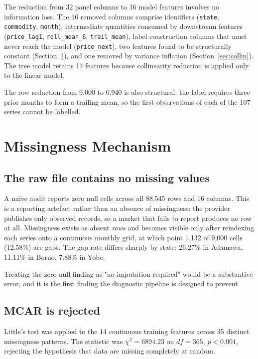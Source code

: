 \documentclass[conference]{IEEEtran}
\begin{document}
The reduction from 32 panel columns to 16 model features involves no
information loss. The 16 removed columns comprise identifiers
(\texttt{state}, \texttt{commodity}, \texttt{month}), intermediate quantities
consumed by downstream features (\texttt{price\_lag1}, \texttt{roll\_mean\_6},
\texttt{trail\_mean}), label construction columns that must never reach the
model (\texttt{price\_next}), two features found to be structurally constant
(Section~\ref{sec:missing}), and one removed by variance inflation
(Section~\ref{sec:collin}). The tree model retains 17 features because
collinearity reduction is applied only to the linear model.

The row reduction from 9{,}000 to 6{,}940 is also structural: the label
requires three prior months to form a trailing mean, so the first observations
of each of the 107 series cannot be labelled.

\section{Missingness Mechanism}
\label{sec:missing}

\subsection{The raw file contains no missing values}

A naive audit reports zero null cells across all 88{,}545 rows and 16 columns.
This is a reporting artefact rather than an absence of missingness: the
provider publishes only observed records, so a market that fails to report
produces no row at all. Missingness exists as absent \emph{rows} and becomes
visible only after reindexing each series onto a continuous monthly grid, at
which point 1{,}132 of 9{,}000 cells (12.58\%) are gaps. The gap rate differs
sharply by state: 26.27\% in Adamawa, 11.11\% in Borno, 7.88\% in Yobe.

Treating the zero-null finding as "no imputation required" would be a
substantive error, and it is the first finding the diagnostic pipeline is
designed to prevent.

\subsection{MCAR is rejected}

Little's test was applied to the 14 continuous training features across 35
distinct missingness patterns. The statistic was
$\chi^2 = 6894.23$ on $df = 365$, $p < 0.001$, rejecting the hypothesis that
data are missing completely at random.
\end{document}
